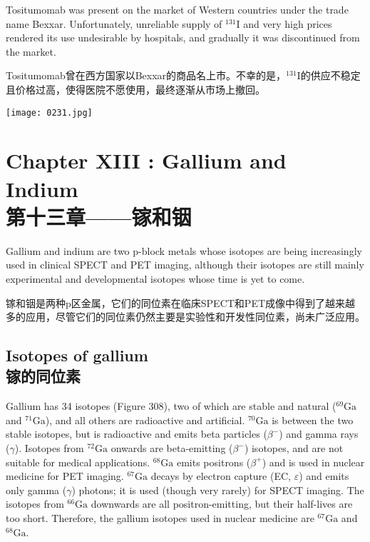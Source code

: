 \documentclass[dvipsnames, svgnames,a4paper,11pt]{article}
\begin{document}
Tositumomab was present on the market of Western countries under the trade name Bexxar. Unfortunately, unreliable supply of \(\mathrm{^{131}I}\) and very high prices rendered its use undesirable by hospitals, and gradually it was discontinued from the market.

Tositumomab曾在西方国家以Bexxar的商品名上市。不幸的是，\(\mathrm{^{131}I}\)的供应不稳定且价格过高，使得医院不愿使用，最终逐渐从市场上撤回。

\begin{figure*}[h]
	\centering
    \texttt{[image: 0231.jpg]}  
\end{figure*}

\newpage


\section{Chapter XIII :  Gallium and Indium \\第十三章——镓和铟}

Gallium and indium are two p-block metals whose isotopes are being increasingly used in clinical SPECT and PET imaging, although their isotopes are still mainly experimental and developmental isotopes whose time is yet to come.

镓和铟是两种p区金属，它们的同位素在临床SPECT和PET成像中得到了越来越多的应用，尽管它们的同位素仍然主要是实验性和开发性同位素，尚未广泛应用。

\subsection{Isotopes of gallium\\ 镓的同位素}  
Gallium has 34 isotopes (Figure 308), two of which are stable and natural (\(\mathrm{^{69}Ga}\) and \(\mathrm{^{71}Ga}\)), and all others are radioactive and artificial. \(\mathrm{^{70}Ga}\) is between the two stable isotopes, but is radioactive and emits beta particles (\(\beta^-\)) and gamma rays (\(\gamma\)). Isotopes from \(\mathrm{^{72}Ga}\) onwards are beta-emitting (\(\beta^-\)) isotopes, and are not suitable for medical applications. \(\mathrm{^{68}Ga}\) emits positrons (\(\beta^+\)) and is used in nuclear medicine for PET imaging. \(\mathrm{^{67}Ga}\) decays by electron capture (EC, \(\varepsilon\)) and emits only gamma (\(\gamma\)) photons; it is used (though very rarely) for SPECT imaging. The isotopes from \(\mathrm{^{66}Ga}\) downwards are all positron-emitting, but their half-lives are too short. Therefore, the gallium isotopes used in nuclear medicine are \(\mathrm{^{67}Ga}\) and \(\mathrm{^{68}Ga}\).
\end{document}
